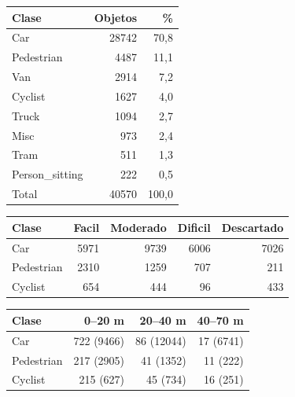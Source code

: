 \begin{tabular}{@{}lrr@{}}
\toprule
\textbf{Clase} & \textbf{Objetos} & \textbf{\%} \\
\midrule
Car & 28742 & 70,8 \\
Pedestrian & 4487 & 11,1 \\
Van & 2914 & 7,2 \\
Cyclist & 1627 & 4,0 \\
Truck & 1094 & 2,7 \\
Misc & 973 & 2,4 \\
Tram & 511 & 1,3 \\
Person_sitting & 222 & 0,5 \\
\midrule
Total & 40570 & 100,0 \\
\bottomrule
\end{tabular}

\begin{tabular}{@{}lrrrr@{}}
\toprule
\textbf{Clase} & \textbf{Facil} & \textbf{Moderado} & \textbf{Dificil} & \textbf{Descartado} \\
\midrule
Car & 5971 & 9739 & 6006 & 7026 \\
Pedestrian & 2310 & 1259 & 707 & 211 \\
Cyclist & 654 & 444 & 96 & 433 \\
\bottomrule
\end{tabular}

\begin{tabular}{@{}lrrr@{}}
\toprule
\textbf{Clase} & \textbf{0--20 m} & \textbf{20--40 m} & \textbf{40--70 m} \\
\midrule
Car & 722 (9466) & 86 (12044) & 17 (6741) \\
Pedestrian & 217 (2905) & 41 (1352) & 11 (222) \\
Cyclist & 215 (627) & 45 (734) & 16 (251) \\
\bottomrule
\end{tabular}
